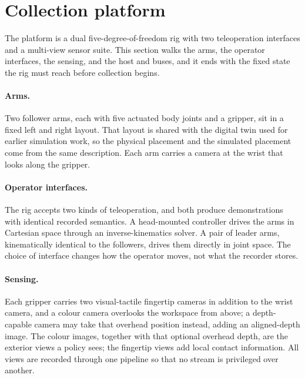 \section{Collection platform}
\label{sec:platform}

The platform is a dual five-degree-of-freedom rig with two teleoperation
interfaces and a multi-view sensor suite. This section walks the arms, the
operator interfaces, the sensing, and the host and buses, and it ends with
the fixed state the rig must reach before collection begins.

\paragraph{Arms.} Two follower arms, each with five actuated body joints
and a gripper, sit in a fixed left and right layout. That layout is shared
with the digital twin used for earlier simulation work, so the physical
placement and the simulated placement come from the same description. Each
arm carries a camera at the wrist that looks along the gripper.

\paragraph{Operator interfaces.} The rig accepts two kinds of
teleoperation, and both produce demonstrations with identical recorded
semantics. A head-mounted controller drives the arms in Cartesian space
through an inverse-kinematics solver. A pair of leader arms, kinematically
identical to the followers, drives them directly in joint space. The choice
of interface changes how the operator moves, not what the recorder stores.

\paragraph{Sensing.} Each gripper carries two visual-tactile fingertip
cameras in addition to the wrist camera, and a colour camera overlooks the
workspace from above; a depth-capable camera may take that overhead position
instead, adding an aligned-depth image. The colour images, together with
that optional overhead depth, are the exterior views a policy sees; the
fingertip views add local contact information. All views are recorded
through one pipeline so that no stream is privileged over another.

